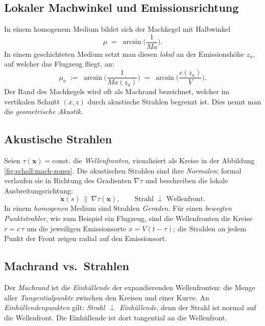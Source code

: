 \subsection{Lokaler Machwinkel und Emissionsrichtung}
In einem homogenem Medium bildet sich der Machkegel mit Halbwinkel
\begin{equation}
    \mu \;=\; \arcsin\!\Bigg(\frac{1}{\textit{Ma}}\Bigg).
\end{equation}
In einem geschichteten Medium setzt man diesen \emph{lokal} an der
Emissionshöhe $z_a$, auf welcher das Flugzeug fliegt, an:
\begin{equation}
    \mu_a \;:=\; \arcsin\!\Bigg(\frac{1}{\textit{Ma}(z_a)}\Bigg)
    \;=\; \arcsin\!\Bigg(\frac{c(z_a)}{V}\Bigg) .
    \label{eq:local-mach-angle}
\end{equation}
Der Rand des Machkegels wird oft als Machrand bezeichnet, welcher im
vertikalen Schnitt $(x,z)$ durch akustische Strahlen begrenzt ist.
Dies nennt man die \emph{geometrische Akustik}.

\subsection*{Akustische Strahlen}
Seien $\tau(\mathbf{x})=\mathrm{const.}$ die \emph{Wellenfronten}, visualisiert
als Kreise in der Abbildung \ref{fig:schall:mach-zones}.
Die akustischen Strahlen sind ihre \emph{Normalen}; formal verlaufen sie
in Richtung des Gradienten $\nabla\tau$ und beschreiben die lokale
Ausbreitungsrichtung:
\[
    \dot{\mathbf{x}}(s)\ \parallel\ \nabla\tau(\mathbf{x}),\qquad
    \text{Strahl}\ \perp\ \text{Wellenfront}.
\]
In einem \emph{homogenen} Medium sind Strahlen \emph{Geraden}.
Für einen \emph{bewegten Punktstrahler}, wie zum Beispiel ein Flugzeug,
sind die Wellenfronten die Kreise $r=c\,\tau$ um die jeweiligen Emissionsorte
$x=V(t-\tau)$; die Strahlen an jedem Punkt der Front zeigen radial auf den Emissionsort.

\subsection*{Machrand vs.\ Strahlen}
Der \emph{Machrand} ist die \emph{Einhüllende} der expandierenden Wellenfronten:
die Menge aller \emph{Tangentialpunkte} zwischen den Kreisen und einer Kurve.
An \emph{Einhüllendenpunkten} gilt: \emph{Strahl $\perp$ Einhüllende},
denn der Strahl ist normal auf die Wellenfront.
Die Einhüllende ist dort tangential an die Wellenfront.

